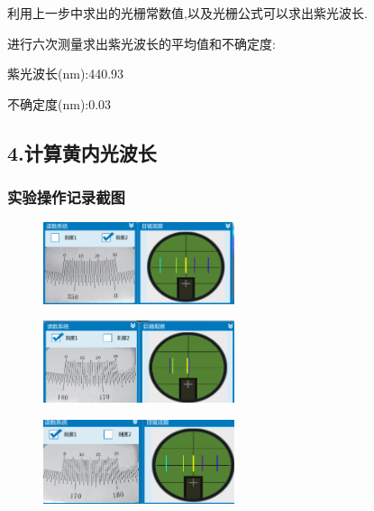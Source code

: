 \documentclass{article}
\begin{document}
利用上一步中求出的光栅常数值,以及光栅公式可以求出紫光波长.

进行六次测量求出紫光波长的平均值和不确定度:

紫光波长(nm):440.93

不确定度(nm):0.03


\subsection*{4.计算黄内光波长}
\subsubsection*{实验操作记录截图}
\begin{figure}[H]
    \centering
    \includegraphics[width=0.5\textwidth]{19.png}
    \end{figure}

    \begin{figure}[H]
        \centering
        \includegraphics[width=0.5\textwidth]{20.png}
        \end{figure}
        \begin{figure}[H]
            \centering
            \includegraphics[width=0.5\textwidth]{21.png}
            \end{figure}
\end{document}

